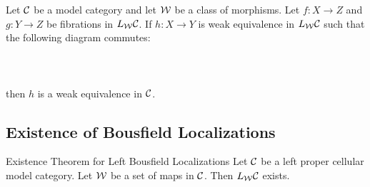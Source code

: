 \documentclass[a4paper]{article}
\begin{document}
\begin{prp}{}{} Let $\mathcal{C}$ be a model category and let $\mathcal{W}$ be a class of morphisms. Let $f:X\to Z$ and $g:Y\to Z$ be fibrations in $L_{\mathcal{W}}\mathcal{C}$. If $h:X\to Y$ is weak equivalence in $L_{\mathcal{W}}\mathcal{C}$ such that the following diagram commutes: \\~\\
\\~\\
then $h$ is a weak equivalence in $\mathcal{C}$. 
\end{prp}

\subsection{Existence of Bousfield Localizations}
\begin{thm}{Existence Theorem for Left Bousfield Localizations}{} Let $\mathcal{C}$ be a left proper cellular model category. Let $\mathcal{W}$ be a set of maps in $\mathcal{C}$. Then $L_{\mathcal{W}}\mathcal{C}$ exists. 
\end{thm}
\end{document}
